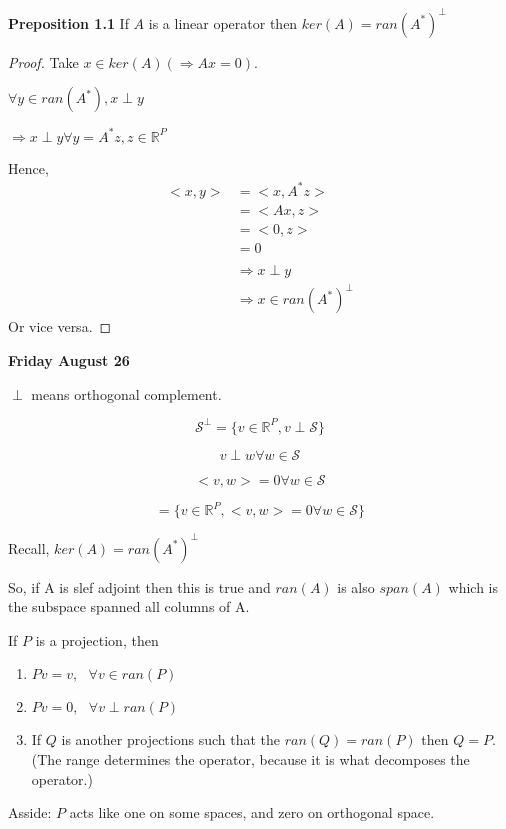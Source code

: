 \documentclass[11pt,fleqn]{book} %
\begin{document}
\textbf{Preposition 1.1} If $A$ is a linear operator then $ker(A) = ran(A^*)^\bot$

\begin{proof}
	Take $x \in ker(A) (\Rightarrow Ax = 0)$. 

	$\forall y \in ran(A^*), x \perp y$

	$\Rightarrow x \perp y \forall y = A^*z, z \in \mathbb{R}^P$

	Hence, 
	\begin{align*}
		<x,y> &= <x, A^*z>\\
			&= <Ax, z>\\
			&= <0, z>\\
			&= 0\\
			\\
			&\Rightarrow x \perp y\\
			&\Rightarrow x \in ran(A^*)^\perp
	\end{align*}
Or vice versa.
\end{proof}

\textbf{Friday August 26}

\begin{remark}
	$\perp$ means orthogonal complement. 

	$$\mathscr{S}^\perp = \{v \in \mathbb{R}^P, v \perp \mathscr{S} \} $$

	$$ v \perp w \forall w \in \mathscr{S} $$

	$$<v,w> = 0 \forall w \in \mathscr{S} $$

	$$ = \{v \in \mathbb{R}^P, <v,w> = 0 \forall w \in \mathscr{S} \} $$
\end{remark}

Recall, 
$ker(A) = ran(A^*)^\perp$

So, if A is slef adjoint then this is true and $ran(A) $ is also $span(A)$ which is the subspace spanned all columns of A. 

\begin{theorem}
	If $P$ is a projection, then 

	\begin{enumerate}
		\item $Pv = v,\text{ } \forall v \in ran(P) $
		\item $Pv = 0,\text{ } \forall v \perp ran(P)$ 
		\item If $Q$ is another projections such that the $ran(Q) = ran(P)$ then $Q=P$. (The range determines the operator, because it is what decomposes the operator.)

	\end{enumerate}

	Asside: $P$ acts like one on some spaces, and zero on orthogonal space.

\end{theorem}
\end{document}
